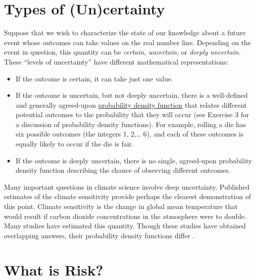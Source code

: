 \documentclass[
  11pt,
]{book}
\providecommand{\tightlist}{%
  \setlength{\itemsep}{0pt}\setlength{\parskip}{0pt}}
\begin{document}
\hypertarget{types-of-uncertainty}{%
\section{Types of (Un)certainty}\label{types-of-uncertainty}}

Suppose that we wish to characterize the state of our knowledge about a future event whose outcomes can take values on the real number line. Depending on the event in question, this quantity can be \emph{certain}, \emph{uncertain}, or \emph{deeply uncertain}. These \enquote{levels of uncertainty} \citep{rieschLevelsUncertainty2013} have different mathematical representations:

\begin{itemize}
\tightlist
\item
  If the outcome is certain, it can take just one value.
\item
  If the outcome is uncertain, but not deeply uncertain, there is a well-defined and generally agreed-upon \href{https://en.wikipedia.org/wiki/Probability_density_function}{probability density function} that relates different potential outcomes to the probability that they will occur (see Exercise 3 for a discussion of probability density functions). For example, rolling a die has six possible outcomes (the integers 1, 2,\ldots{} 6), and each of these outcomes is equally likely to occur if the die is fair.
\item
  If the outcome is deeply uncertain, there is no single, agreed-upon probability density function describing the chance of observing different outcomes.
\end{itemize}

Many important questions in climate science involve deep uncertainty. Published estimates of the climate sensitivity provide perhaps the clearest demonstration of this point. Climate sensitivity is the change in global mean temperature that would result if carbon dioxide concentrations in the atmosphere were to double. Many studies have estimated this quantity. Though these studies have obtained overlapping answers, their probability density functions differ \citetext{\citealp[their Fig. 1 in Box 12.2]{Collins2013-yi}; \citealp[their Fig. 9.20]{Meehl2007-zp}}.

\hypertarget{what-is-risk}{%
\section{What is Risk?}\label{what-is-risk}}
\end{document}
